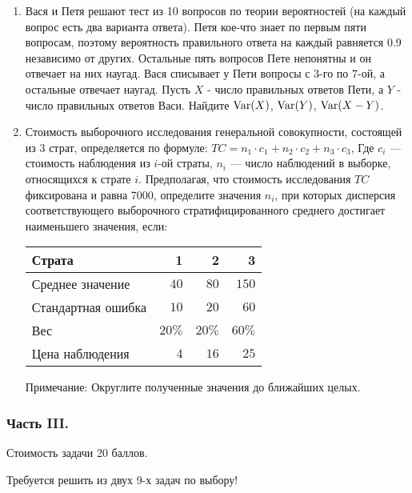 \begin{enumerate}
\item Вася и Петя решают тест из 10 вопросов по теории вероятностей (на каждый вопрос есть два варианта ответа). Петя кое-что знает по первым пяти вопросам, поэтому вероятность правильного ответа на каждый равняется 0.9 независимо от других. Остальные пять вопросов Пете непонятны и он отвечает на них наугад. Вася списывает у Пети вопросы с 3-го по 7-ой, а остальные отвечает наугад.
Пусть $X$ - число правильных ответов Пети, а $Y$ - число правильных ответов Васи.
Найдите $\operatorname{Var}(X)$, $\operatorname{Var}(Y)$, $\operatorname{Var}(X-Y)$.

\item Стоимость выборочного исследования генеральной совокупности, состоящей из 3 страт, определяется по формуле: $TC=n_{1}\cdot c_{1}+n_{2}\cdot c_{2}+n_{3}\cdot c_{3}$,
Где $c_{i}$ — стоимость наблюдения из $i$-ой страты, $n_{i}$ — число наблюдений в выборке, относящихся к страте $i$.
Предполагая, что стоимость исследования $TC$ фиксирована и равна 7000, определите значения $n_{i}$, при которых дисперсия соответствующего выборочного стратифицированного среднего достигает наименьшего значения, если:

\begin{tabular}{@{}lrrr@{}}
\toprule
Страта             & 1     & 2     & 3     \\ \midrule
Среднее значение   & $40$  & $80$  & $150$ \\
Стандартная ошибка & $10$  & $20$  & $60$  \\
Вес                & $20\%$ & $20\%$ & $60\%$ \\
Цена наблюдения    & $4$   & $16$  & $25$  \\ \bottomrule
\end{tabular}

Примечание: Округлите полученные значения до ближайших целых.
\end{enumerate}



\subsubsection*{Часть III.}

Стоимость задачи 20 баллов.

Требуется решить \textbf{} из двух 9-х задач по выбору!

